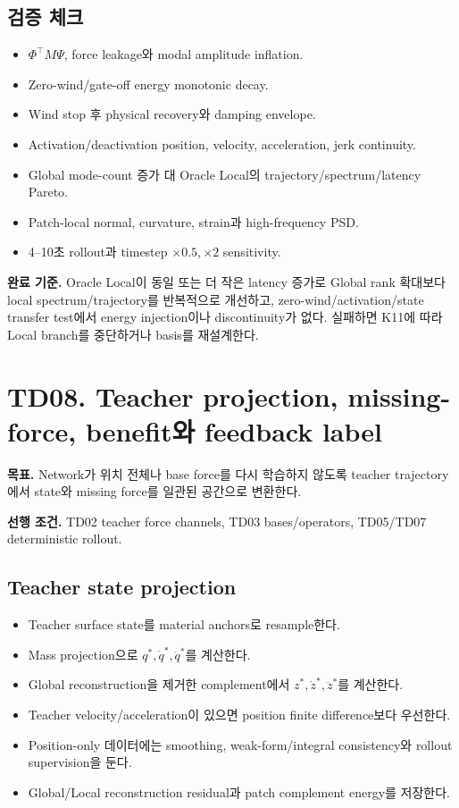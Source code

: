 \documentclass[10pt,a4paper]{article}
\newcommand{\todo}{\textcolor{TodoGray}{\(\square\)}}
\begin{document}
\subsection*{검증 체크}

\begin{itemize}
  \item[\todo] \(\Phi^\top M\Psi\), force leakage와 modal amplitude inflation.
  \item[\todo] Zero-wind/gate-off energy monotonic decay.
  \item[\todo] Wind stop 후 physical recovery와 damping envelope.
  \item[\todo] Activation/deactivation position, velocity, acceleration, jerk continuity.
  \item[\todo] Global mode-count 증가 대 Oracle Local의 trajectory/spectrum/latency Pareto.
  \item[\todo] Patch-local normal, curvature, strain과 high-frequency PSD.
  \item[\todo] 4--10초 rollout과 timestep \(\times0.5,\times2\) sensitivity.
\end{itemize}

\textbf{완료 기준.}
Oracle Local이 동일 또는 더 작은 latency 증가로 Global rank 확대보다 local spectrum/trajectory를 반복적으로 개선하고,
zero-wind/activation/state transfer test에서 energy injection이나 discontinuity가 없다.
실패하면 K11에 따라 Local branch를 중단하거나 basis를 재설계한다.

\section{TD08. Teacher projection, missing-force, benefit와 feedback label}

\textbf{목표.}
Network가 위치 전체나 base force를 다시 학습하지 않도록 teacher trajectory에서 state와 missing force를 일관된 공간으로 변환한다.

\textbf{선행 조건.} TD02 teacher force channels, TD03 bases/operators, TD05/TD07 deterministic rollout.

\subsection*{Teacher state projection}

\begin{itemize}
  \item[\todo] Teacher surface state를 material anchors로 resample한다.
  \item[\todo] Mass projection으로 \(q^*,\dot q^*,\ddot q^*\)를 계산한다.
  \item[\todo] Global reconstruction을 제거한 complement에서 \(z^*,\dot z^*,\ddot z^*\)를 계산한다.
  \item[\todo] Teacher velocity/acceleration이 있으면 position finite difference보다 우선한다.
  \item[\todo] Position-only 데이터에는 smoothing, weak-form/integral consistency와 rollout supervision을 둔다.
  \item[\todo] Global/Local reconstruction residual과 patch complement energy를 저장한다.
\end{itemize}
\end{document}
